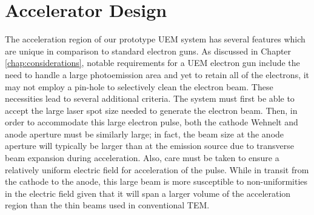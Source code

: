 
\section{Accelerator Design} \label{sec:gun_design}

The acceleration region of our prototype UEM system has several features which are unique in comparison to standard electron guns.
As discussed in Chapter \ref{chap:considerations}, notable requirements for a UEM electron gun include the need to handle a large photoemission area and yet to retain all of the electrons, it may not employ a pin-hole to selectively clean the electron beam.
These necessities lead to several additional criteria.
The system must first be able to accept the large laser spot size needed to generate the electron beam.
Then, in order to accommodate this large electron pulse, both the cathode Wehnelt and anode aperture must be similarly large; in fact, the beam size at the anode aperture will typically be larger than at the emission source due to transverse beam expansion during acceleration.
Also, care must be taken to ensure a relatively uniform electric field for acceleration of the pulse.
While in transit from the cathode to the anode, this large beam is more susceptible to non-uniformities in the electric field given that it will span a larger volume of the acceleration region than the thin beams used in conventional TEM.

